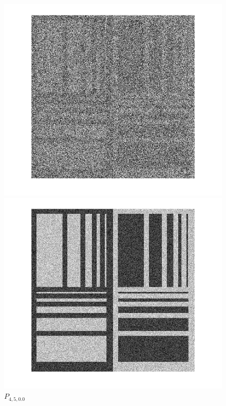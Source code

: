 \documentclass[12pt,a4paper]{article}
\begin{document}
\begin{figure}[!htb]
  \includegraphics[width=\linewidth]{Eq_Phantom_0p000_3_5_1_histeq.jpg}
	\caption{$P_{3,5,0.0}$}\label{fig:awesome_image1}
\endminipage\hfill
{}
  \includegraphics[width=\linewidth]{Eq_Phantom_0p000_4_5_1_histeq.jpg}
	\caption{$P_{4,5,0.0}$}\label{fig:awesome_image1}
\endminipage\hfill
\end{figure}
\end{document}

